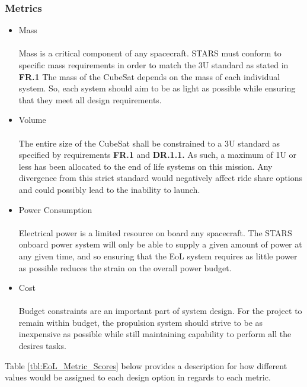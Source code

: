\subsubsection{Metrics}
\begin{itemize}
\item Mass\\
\\
Mass is a critical component of any spacecraft. STARS must conform to specific mass requirements in order to match the 3U standard as stated in \textbf{FR.1} The mass of the CubeSat depends on the mass of each individual system. So, each system should aim to be as light as possible while ensuring that they meet all design requirements.
\\
\item{Volume} \\
\\
The entire size of the CubeSat shall be constrained to a 3U standard as specified by requirements \textbf{FR.1}  and  \textbf{DR.1.1.}  As  such,  a maximum  of  1U  or  less  has  been  allocated  to  the  end  of  life  systems on  this mission. Any  divergence  from  this  strict  standard  would  negatively  affect  ride  share options  and  could possibly lead to the inability to launch.
\\
\item{Power Consumption} \\
\\
Electrical power is a limited resource on board any spacecraft. The STARS onboard power system will only be able to supply a given amount of power at any given time, and so ensuring that the EoL system requires as little power as possible reduces the strain on the overall power budget.
\\
\item{Cost} \\
\\
Budget constraints are an important part of system design. For the project to remain within budget, the propulsion system should strive to be as inexpensive as possible while still maintaining capability to perform all the desires tasks.  
\end{itemize}

Table \ref{tbl:EoL_Metric_Scores} below provides a description for how different values would be assigned to each design option in regards to each metric. 

